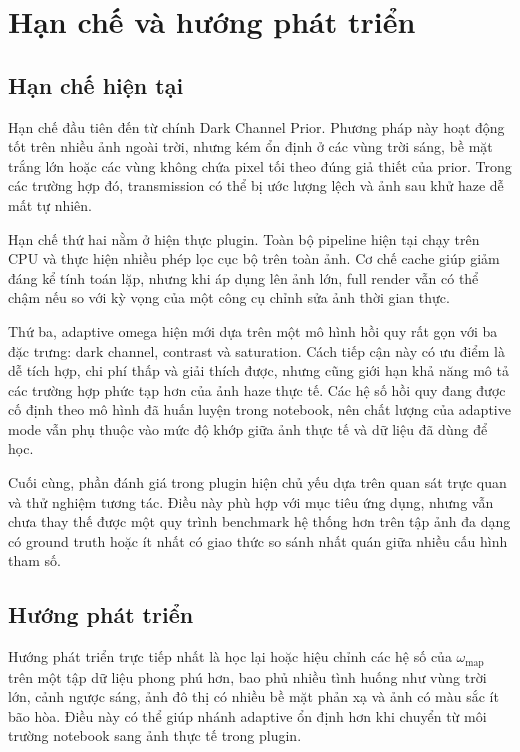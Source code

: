 \section{Hạn chế và hướng phát triển}

\subsection{Hạn chế hiện tại}

Hạn chế đầu tiên đến từ chính Dark Channel Prior. Phương pháp này hoạt động tốt trên nhiều ảnh ngoài trời, nhưng kém ổn định ở các vùng trời sáng, bề mặt trắng lớn hoặc các vùng không chứa pixel tối theo đúng giả thiết của prior. Trong các trường hợp đó, transmission có thể bị ước lượng lệch và ảnh sau khử haze dễ mất tự nhiên.

Hạn chế thứ hai nằm ở hiện thực plugin. Toàn bộ pipeline hiện tại chạy trên CPU và thực hiện nhiều phép lọc cục bộ trên toàn ảnh. Cơ chế cache giúp giảm đáng kể tính toán lặp, nhưng khi áp dụng lên ảnh lớn, full render vẫn có thể chậm nếu so với kỳ vọng của một công cụ chỉnh sửa ảnh thời gian thực.

Thứ ba, adaptive omega hiện mới dựa trên một mô hình hồi quy rất gọn với ba đặc trưng: dark channel, contrast và saturation. Cách tiếp cận này có ưu điểm là dễ tích hợp, chi phí thấp và giải thích được, nhưng cũng giới hạn khả năng mô tả các trường hợp phức tạp hơn của ảnh haze thực tế. Các hệ số hồi quy đang được cố định theo mô hình đã huấn luyện trong notebook, nên chất lượng của adaptive mode vẫn phụ thuộc vào mức độ khớp giữa ảnh thực tế và dữ liệu đã dùng để học.

Cuối cùng, phần đánh giá trong plugin hiện chủ yếu dựa trên quan sát trực quan và thử nghiệm tương tác. Điều này phù hợp với mục tiêu ứng dụng, nhưng vẫn chưa thay thế được một quy trình benchmark hệ thống hơn trên tập ảnh đa dạng có ground truth hoặc ít nhất có giao thức so sánh nhất quán giữa nhiều cấu hình tham số.

\subsection{Hướng phát triển}

Hướng phát triển trực tiếp nhất là học lại hoặc hiệu chỉnh các hệ số của \(\omega_{\mathrm{map}}\) trên một tập dữ liệu phong phú hơn, bao phủ nhiều tình huống như vùng trời lớn, cảnh ngược sáng, ảnh đô thị có nhiều bề mặt phản xạ và ảnh có màu sắc ít bão hòa. Điều này có thể giúp nhánh adaptive ổn định hơn khi chuyển từ môi trường notebook sang ảnh thực tế trong plugin.

